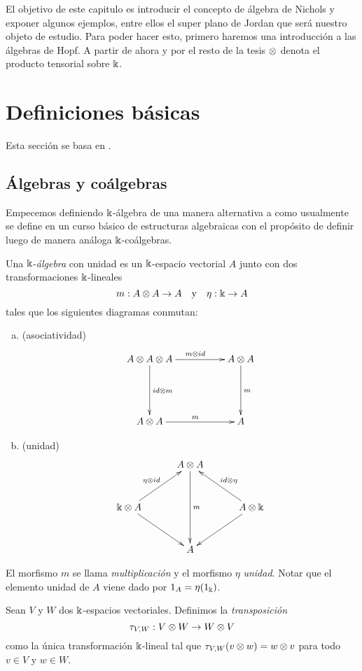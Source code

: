 \documentclass[a4paper,oneside,fleqn,11pt,../tesis.tex]{subfiles}
\begin{document}
El objetivo de este capitulo es introducir el concepto de álgebra de Nichols y exponer algunos ejemplos, entre 
ellos el super plano de Jordan que será nuestro objeto de estudio. Para poder hacer esto, primero haremos una introducción a las álgebras
de Hopf. A partir de ahora y por el resto de la tesis $\otimes$
denota el producto tensorial sobre $\Bbbk$.

\section{Definiciones básicas}
Esta sección se basa en \cite{Mon}. 

\subsection{Álgebras y coálgebras}

Empecemos definiendo $\Bbbk$-álgebra de una manera alternativa a como usualmente se define en un
curso básico de estructuras algebraicas con el propósito de definir luego de manera análoga $\Bbbk$-coálgebras. 

\begin{definition}\label{defalgebra} Una $\Bbbk$-\emph{álgebra} con unidad es un $\Bbbk$-espacio vectorial $A$ junto con dos
transformaciones $\Bbbk$-lineales
\[
	m: A \otimes A \to A \quad\text{y}\quad \eta: \Bbbk \to A
\]
tales que los siguientes diagramas conmutan:
\begin{enumerate}[(a)]
\item (asociatividad)
\begin{align*}
\xymatrix@=5em{
	A \ox A \ox A \ar[r]^{m \ox id} \ar[d]^{id \ox m} & A \ox A \ar[d]^{m} \\
	A \ox A \ar[r]^{m} & A
}
\end{align*}
\item (unidad)
\begin{align*}
\xymatrix@=3em{
	& A \ox A \ar[dd]^{m} & \\
	\field \ox A \ar[ur]^{\eta \ox id} \ar[dr] & & A \ox \field \ar[ul]_{id \ox \eta} \ar[dl] \\
	& A &
}
\end{align*}
\end{enumerate}
El morfismo $m$ se llama \emph{multiplicación} y el morfismo $\eta$ \emph{unidad}. 
Notar que el elemento unidad de $A$ viene dado por $1_{A} = \eta(1_{\Bbbk})$.
\end{definition}

\begin{definition}
	Sean $V$ y $W$ dos $\Bbbk$-espacios vectoriales. Definimos la \emph{transposición}
	\[
		\tau_{V,W}: V \otimes W \to W \otimes V
	\]
	como la única transformación $\Bbbk$-lineal tal que
	$\tau_{V,W}(v \otimes w) = w \otimes v$ para todo $v \in V$ y $w \in W$.
\end{definition}
\end{document}
